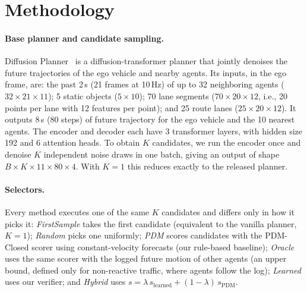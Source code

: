 \documentclass{article}
\begin{document}
\section{Methodology}

\paragraph{Base planner and candidate sampling.}
Diffusion Planner~\cite{zheng2025diffusion} is a diffusion-transformer planner that jointly denoises the future trajectories of the ego vehicle and nearby agents. Its inputs, in the ego frame, are: the past 2\,s (21 frames at 10\,Hz) of up to 32 neighboring agents ($32\times21\times11$); 5 static objects ($5\times10$); 70 lane segments ($70\times20\times12$, i.e., 20 points per lane with 12 features per point); and 25 route lanes ($25\times20\times12$). It outputs 8\,s (80 steps) of future trajectory for the ego vehicle and the 10 nearest agents. The encoder and decoder each have 3 transformer layers, with hidden size 192 and 6 attention heads. To obtain $K$ candidates, we run the encoder once and denoise $K$ independent noise draws in one batch, giving an output of shape $B\times K\times11\times80\times4$. With $K=1$ this reduces exactly to the released planner.

\paragraph{Selectors.}
Every method executes one of the same $K$ candidates and differs only in how it picks it:
\emph{FirstSample} takes the first candidate (equivalent to the vanilla planner, $K=1$);
\emph{Random} picks one uniformly;
\emph{PDM} scores candidates with the PDM-Closed scorer using constant-velocity forecasts (our rule-based baseline);
\emph{Oracle} uses the same scorer with the logged future motion of other agents (an upper bound, defined only for non-reactive traffic, where agents follow the log);
\emph{Learned} uses our verifier; and
\emph{Hybrid} uses $s = \lambda\,s_{\text{learned}} + (1-\lambda)\,s_{\text{PDM}}$.
\end{document}
